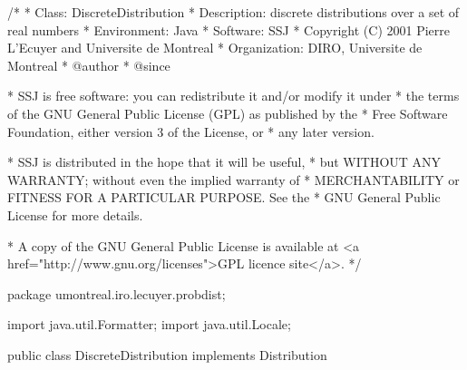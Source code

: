 \begin{code}
\begin{hide}
/*
 * Class:        DiscreteDistribution
 * Description:  discrete distributions over a set of real numbers
 * Environment:  Java
 * Software:     SSJ
 * Copyright (C) 2001  Pierre L'Ecuyer and Universite de Montreal
 * Organization: DIRO, Universite de Montreal
 * @author
 * @since

 * SSJ is free software: you can redistribute it and/or modify it under
 * the terms of the GNU General Public License (GPL) as published by the
 * Free Software Foundation, either version 3 of the License, or
 * any later version.

 * SSJ is distributed in the hope that it will be useful,
 * but WITHOUT ANY WARRANTY; without even the implied warranty of
 * MERCHANTABILITY or FITNESS FOR A PARTICULAR PURPOSE.  See the
 * GNU General Public License for more details.

 * A copy of the GNU General Public License is available at
   <a href="http://www.gnu.org/licenses">GPL licence site</a>.
 */
\end{hide}
package umontreal.iro.lecuyer.probdist;\begin{hide}

import java.util.Formatter;
import java.util.Locale;\end{hide}


public class DiscreteDistribution implements Distribution\begin{hide} {
  /*
     For better precision in the tails, we keep the cumulative probabilities
     (F) in cdf[x] for x <= xmed (i.e. cdf[x] is the sum off all the probabi-
     lities pr[i] for i <= x),
     and the complementary cumulative probabilities (1 - F) in cdf[x] for
     x > xmed (i.e. cdf[x] is the sum off all the probabilities pr[i]
     for i >= x).
  */

   protected double cdf[] = null;    // cumulative probabilities
   protected double pr[] = null;     // probability terms or mass distribution
   protected int xmin = 0;           // pr[x] = 0 for x < xmin
   protected int xmax = 0;           // pr[x] = 0 for x > xmax
   protected int xmed = 0;           // cdf[x] = F(x) for x <= xmed, and
                                     // cdf[x] = bar_F(x) for x > xmed
   protected int nVal;               // number of different values
   protected double sortedVal[];
   protected double supportA = Double.NEGATIVE_INFINITY;
   protected double supportB = Double.POSITIVE_INFINITY;
\end{hide}
\end{code}



